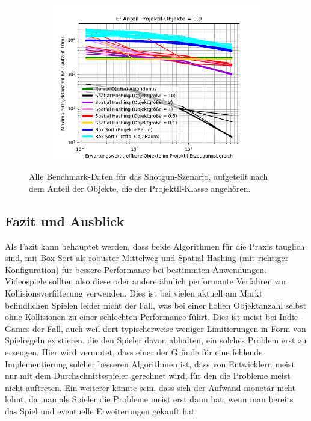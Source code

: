 \begin{figure}
\begin{subfigure}[t]{0.55\textwidth}
		\label{fig:shotgunComparison-D}
	\end{subfigure}
~
	\begin{subfigure}[t]{0.55\textwidth}
		\centering
		\includegraphics[width=1\textwidth]{./res/shotgunComparison-E.png}

		\label{fig:shotgunComparison-E}
	\end{subfigure}

	\caption{Alle Benchmark-Daten für das Shotgun-Szenario, aufgeteilt nach dem Anteil der Objekte, die der Projektil-Klasse angehören.}
	\label{fig:shotgunComparison}
\end{figure}

\subsection{Fazit und Ausblick}
Als Fazit kann behauptet werden, dass beide Algorithmen für die Praxis tauglich sind, mit Box-Sort als robuster Mittelweg und  Spatial-Hashing (mit richtiger Konfiguration) für bessere Performance bei bestimmten Anwendungen. Videospiele sollten also diese oder andere ähnlich performante Verfahren zur Kollisionsvorfilterung verwenden. Dies ist bei vielen aktuell am Markt befindlichen Spielen leider nicht der Fall, was bei einer hohen Objektanzahl selbst ohne Kollisionen zu einer schlechten Performance führt. Dies ist meist bei Indie-Games der Fall, auch weil dort typischerweise weniger Limitierungen in Form von Spielregeln existieren, die den Spieler davon abhalten, ein solches Problem erst zu erzeugen. Hier wird vermutet, dass einer der Gründe für eine fehlende Implementierung solcher besseren Algorithmen ist, dass von Entwicklern meist nur mit dem Durchschnittsspieler gerechnet wird, für den die Probleme meist nicht auftreten. Ein weiterer könnte sein, dass sich der Aufwand monetär nicht lohnt, da man als Spieler die Probleme meist erst dann hat, wenn man bereits das Spiel und eventuelle Erweiterungen gekauft hat.\\

